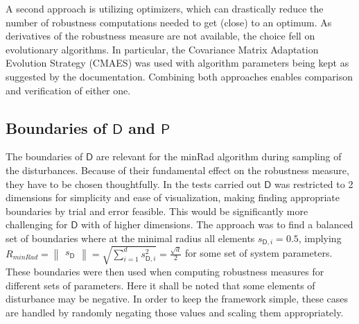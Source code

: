     A second approach is utilizing optimizers, which can drastically reduce the number of robustness computations needed to get (close) to an optimum. As derivatives of the robustness measure are not available, the choice fell on evolutionary algorithms. In particular, the Covariance Matrix Adaptation Evolution Strategy (CMAES) was used with algorithm parameters being kept as suggested by the documentation. Combining both approaches enables comparison and verification of either one. 





\subsection{Boundaries of $\mathsf{D}$ and $\mathsf{P}$ } \label{bounds}

    The boundaries of $\mathsf{D}$ are relevant for the minRad algorithm during sampling of the disturbances. Because of their fundamental effect on the robustness measure, they have to be chosen thoughtfully. In the tests carried out $\mathsf{D}$ was restricted to 2 dimensions for simplicity and ease of visualization, making finding appropriate boundaries by trial and error feasible. This would be significantly more challenging for $\mathsf{D}$ with of higher dimensions. The approach was to find a balanced set of boundaries where at the minimal radius all elements $s_{\mathsf{D},i} = 0.5$, implying $R_{minRad} = \begin{Vmatrix}s_{\mathsf{D}}\end{Vmatrix}= \sqrt{\sum_{i=1}^{d} s_{\mathsf{D},i}^2} = \frac{\sqrt{d}}{2}$ for some set of system parameters. These boundaries were then used when computing robustness measures for different sets of parameters. 
    Here it shall be noted that some elements of disturbance may be negative. In order to keep the framework simple, these cases are handled by randomly negating those values and scaling them appropriately. 

